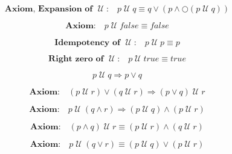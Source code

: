 \documentclass[fleqn, leqno]{article}
\newcommand{\Until}{\;\mathcal{U}\;}
\newcommand{\Next}{\bigcirc}
\newcommand{\spacer}{\vspace{-30pt}}
\newcommand{\firstspacer}{\vspace{-26pt}}
\begin{document}
\firstspacer

\begin{equation}\label{E:expansionUntil}
\textbf{Axiom, Expansion of $\Until$:}\quad p \Until q \equiv q \lor (p \land \Next (p \Until q))
\end{equation}

\spacer

\begin{equation}\label{E:untilFalse}
\textbf{Axiom:}\quad p \Until false \equiv false
\end{equation}

\spacer

\begin{equation}\label{E:idemUntil}
\textbf{Idempotency of $\Until$:}\quad p \Until p \equiv p
\end{equation}

\spacer

\begin{equation}\label{E:zeroUntil}
\textbf{Right zero of $\Until$:}\quad p \Until true \equiv true
\end{equation}

\spacer

\begin{equation}\label{E:untilImpOr}
p \Until q \Rightarrow p \lor q
\end{equation}

\spacer

\begin{equation}\label{E:untilOrImp}
\textbf{Axiom:}\quad (p \Until r) \lor (q \Until r) \Rightarrow (p \lor q) \Until r
\end{equation}

\spacer

\begin{equation}\label{E:untilAndImp}
\textbf{Axiom:}\quad p \Until (q \land r) \Rightarrow (p \Until q) \land (p \Until r)
\end{equation}

\spacer

\begin{equation}\label{E:untilAndEquiv}
\textbf{Axiom:}\quad (p \land q) \Until r \equiv (p \Until r) \land (q \Until r)
\end{equation}

\spacer

\begin{equation}\label{E:untilOrEquiv}
\textbf{Axiom:}\quad p \Until (q \lor r) \equiv (p \Until q) \lor (p \Until r)
\end{equation}
\end{document}
